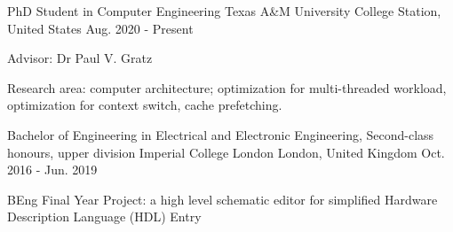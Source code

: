 
\begin{cventries}
\cventry
    {PhD Student in Computer Engineering} %
    {Texas A\&M University} %
    {College Station, United States} %
    {Aug. 2020 - Present} %
    {
      \begin{cvitems} %
         \item {Advisor: Dr Paul V. Gratz}
         \item {Research area: computer architecture; optimization for multi-threaded workload, optimization for context switch, cache prefetching.}
      \end{cvitems}
    }
  \cventry
    {Bachelor of Engineering in Electrical and Electronic Engineering, Second-class honours, upper division} %
    {Imperial College London} %
    {London, United Kingdom} %
    {Oct. 2016 - Jun. 2019} %
    {
      \begin{cvitems} %
         \item {BEng Final Year Project: a high level schematic editor for simplified Hardware Description Language (HDL) Entry}
      \end{cvitems}
    }
\end{cventries}
